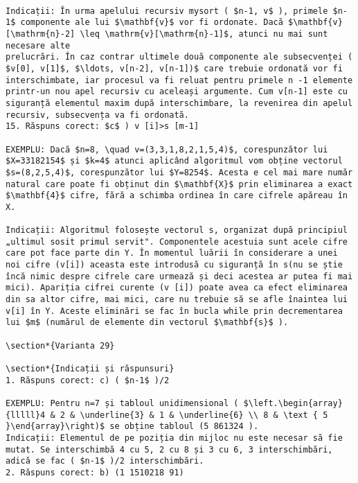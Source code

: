 \begin{verbatim}

Indicații: În urma apelului recursiv mysort ( $n-1, v$ ), primele $n-1$ componente ale lui $\mathbf{v}$ vor fi ordonate. Dacă $\mathbf{v}[\mathrm{n}-2] \leq \mathrm{v}[\mathrm{n}-1]$, atunci nu mai sunt necesare alte
prelucrări. În caz contrar ultimele două componente ale subsecvenței ( $v[0], v[1]$, $\ldots, v[n-2], v[n-1])$ care trebuie ordonată vor fi interschimbate, iar procesul va fi reluat pentru primele n -1 elemente printr-un nou apel recursiv cu aceleași argumente. Cum v[n-1] este cu siguranță elementul maxim după interschimbare, la revenirea din apelul recursiv, subsecvența va fi ordonată.
15. Răspuns corect: $c$ ) v [i]>s [m-1]

EXEMPLU: Dacă $n=8, \quad v=(3,3,1,8,2,1,5,4)$, corespunzător lui $X=33182154$ și $k=4$ atunci aplicând algoritmul vom obține vectorul $s=(8,2,5,4)$, corespunzător lui $Y=8254$. Acesta e cel mai mare număr natural care poate fi obținut din $\mathbf{X}$ prin eliminarea a exact $\mathbf{4}$ cifre, fără a schimba ordinea în care cifrele apăreau în X.

Indicații: Algoritmul folosește vectorul s, organizat după principiul „ultimul sosit primul servit". Componentele acestuia sunt acele cifre care pot face parte din Y. În momentul luării în considerare a unei noi cifre (v[i]) aceasta este introdusă cu siguranță în s(nu se știe încă nimic despre cifrele care urmează și deci acestea ar putea fi mai mici). Apariția cifrei curente (v [i]) poate avea ca efect eliminarea din sa altor cifre, mai mici, care nu trebuie să se afle înaintea lui v[i] în Y. Aceste eliminări se fac în bucla while prin decrementarea lui $m$ (numărul de elemente din vectorul $\mathbf{s}$ ).

\section*{Varianta 29}

\section*{Indicații și răspunsuri}
1. Răspuns corect: c) ( $n-1$ )/2

EXEMPLU: Pentru n=7 și tabloul unidimensional ( $\left.\begin{array}{lllll}4 & 2 & \underline{3} & 1 & \underline{6} \\ 8 & \text { 5 }\end{array}\right)$ se obține tabloul (5 861324 ).
Indicații: Elementul de pe poziția din mijloc nu este necesar să fie mutat. Se interschimbă 4 cu 5, 2 cu 8 și 3 cu 6, 3 interschimbări, adică se fac ( $n-1$ )/2 interschimbări.
2. Răspuns corect: b) (1 1510218 91)


\end{verbatim}
